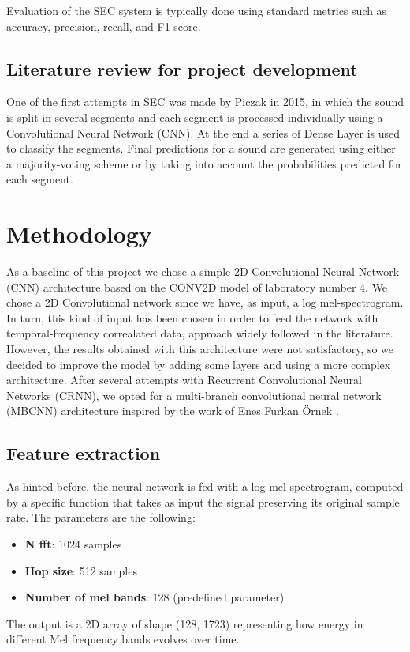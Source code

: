 \documentclass{article}
\begin{document}
\begin{sloppy}
Evaluation of the SEC system is typically done using standard metrics such as accuracy, precision, recall, and F1-score.

\subsection{Literature review for project development}
\label{sec:literature_review_project_development}
One of the first attempts in SEC was made by Piczak \cite{Piczak2015environmental} in 2015, in which the sound is split in several segments
and each segment is processed individually using a Convolutional Neural Network (CNN). At the end a series of Dense Layer is used to classify the segments.
Final predictions for a sound are generated using either a majority-voting scheme or by taking into account the
probabilities predicted for each segment.



\section{Methodology}
\label{sec:methodology}
As a baseline of this project we chose a simple 2D Convolutional Neural Network (CNN) architecture based on the CONV2D model of laboratory number 4.
We chose a 2D Convolutional network since we have, as input, a log mel-spectrogram. In turn, this kind of input has been chosen in order to feed the network with
temporal-frequency correalated data, approach widely followed in the literature. However, the results obtained with this architecture were not satisfactory,
so we decided to improve the model by adding some layers and using a more complex architecture. After several attempts with Recurrent Convolutional Neural Networks (CRNN),
we opted for a multi-branch convolutional neural network (MBCNN) architecture inspired by the work of Enes Furkan Örnek \cite{audio_classification_esc50, latifi2025classificationheartsoundsusing}.

\subsection{Feature extraction}
\label{sec:feature_extraction}
As hinted before, the neural network is fed with a log mel-spectrogram, computed by a specific function that takes as input
the signal preserving its original sample rate. The parameters are the following:
\begin{itemize}
    \item \textbf{N fft}: 1024 samples
    \item \textbf{Hop size}: 512 samples
    \item \textbf{Number of mel bands}: 128 (predefined parameter)
\end{itemize}
The output is a 2D array of shape (128, 1723) representing how energy in different Mel frequency bands evolves over time.


\end{sloppy}
\end{document}
